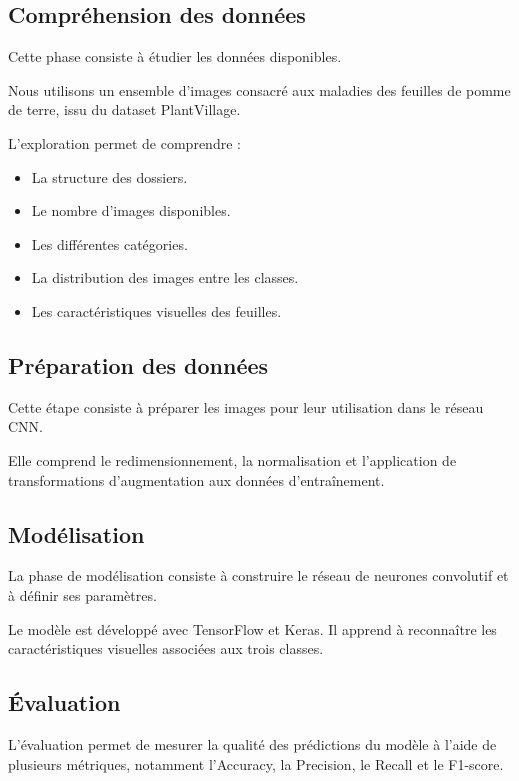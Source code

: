 \documentclass[12pt,a4paper,oneside]{report}
\begin{document}
\subsection{Compréhension des données}

Cette phase consiste à étudier les données disponibles.

Nous utilisons un ensemble d'images consacré aux maladies
des feuilles de pomme de terre, issu du dataset PlantVillage.

L'exploration permet de comprendre :

\begin{itemize}
    \item La structure des dossiers.
    \item Le nombre d'images disponibles.
    \item Les différentes catégories.
    \item La distribution des images entre les classes.
    \item Les caractéristiques visuelles des feuilles.
\end{itemize}

\subsection{Préparation des données}

Cette étape consiste à préparer les images pour leur
utilisation dans le réseau CNN.

Elle comprend le redimensionnement, la normalisation
et l'application de transformations d'augmentation
aux données d'entraînement.

\subsection{Modélisation}

La phase de modélisation consiste à construire le réseau
de neurones convolutif et à définir ses paramètres.

Le modèle est développé avec TensorFlow et Keras.
Il apprend à reconnaître les caractéristiques visuelles
associées aux trois classes.

\subsection{Évaluation}

L'évaluation permet de mesurer la qualité des prédictions
du modèle à l'aide de plusieurs métriques, notamment
l'Accuracy, la Precision, le Recall et le F1-score.
\end{document}

